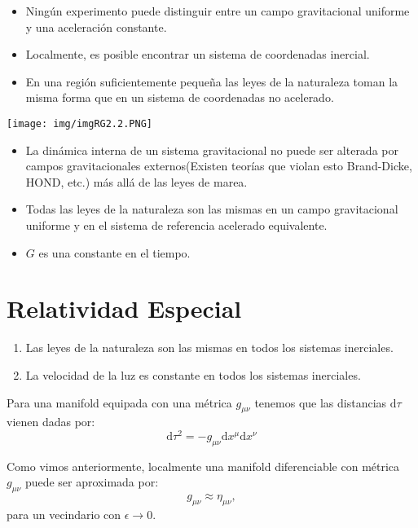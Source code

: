 \documentclass[../main]{subfiles}
\begin{document}
\begin{adjustwidth}{0pt}{-100pt}
\begin{itemize}
    \item Ningún experimento puede distinguir entre un campo gravitacional uniforme y una aceleración constante.
    \item Localmente, es posible encontrar un sistema de coordenadas inercial.
    \item En una región suficientemente pequeña las leyes de la naturaleza toman la misma forma que en un sistema de coordenadas no acelerado.
\end{itemize}
\begin{center}
    \texttt{[image: img/imgRG2.2.PNG]}
\end{center}

\begin{itemize}
    \item La dinámica interna de un sistema gravitacional no puede ser alterada por campos gravitacionales externos(Existen teorías que violan esto Brand-Dicke, HOND, etc.) más allá de las leyes de marea.
    \item Todas las leyes de la naturaleza son las mismas en un campo gravitacional uniforme y en el sistema de referencia acelerado equivalente.
    \item $G$ es una constante en el tiempo.
\end{itemize}

\section{Relatividad Especial}\label{part2.3}
\begin{enumerate}
    \item Las leyes de la naturaleza son las mismas en todos los sistemas inerciales.
    \item La velocidad de la luz es constante en todos los sistemas inerciales.
\end{enumerate}
Para una manifold equipada con una métrica $g_{\mu\nu}$ tenemos que las distancias $\mathrm{d}\tau$ vienen dadas por:
\begin{equation}
    \mathrm{d}\tau^2=-g_{\mu\nu}\mathrm{d}x^{\mu}\mathrm{d}x^{\nu}
\end{equation}

Como vimos anteriormente, localmente una manifold diferenciable con métrica $g_{\mu\nu}$ puede ser aproximada por:
\begin{equation}
    g_{\mu\nu} \approx \eta_{\mu\nu},
\end{equation}
para un vecindario con $\epsilon\rightarrow 0$.


\end{adjustwidth}
\end{document}

